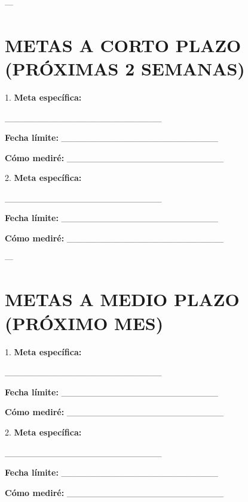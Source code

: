 \documentclass[a4paper,11pt]{article}
\begin{document}
---

\vspace{0.2cm}

\section{METAS A CORTO PLAZO (PRÓXIMAS 2 SEMANAS)}

\vspace{0.2cm}

1. \textbf{Meta específica:}

_________________________

\textbf{Fecha límite:} _________________________

\textbf{Cómo mediré:} _________________________

\vspace{0.2cm}

2. \textbf{Meta específica:}

_________________________

\textbf{Fecha límite:} _________________________

\textbf{Cómo mediré:} _________________________

\vspace{0.2cm}

---

\vspace{0.2cm}

\section{METAS A MEDIO PLAZO (PRÓXIMO MES)}

\vspace{0.2cm}

1. \textbf{Meta específica:}

_________________________

\textbf{Fecha límite:} _________________________

\textbf{Cómo mediré:} _________________________

\vspace{0.2cm}

2. \textbf{Meta específica:}

_________________________

\textbf{Fecha límite:} _________________________

\textbf{Cómo mediré:} _________________________

\vspace{0.2cm}
\end{document}

